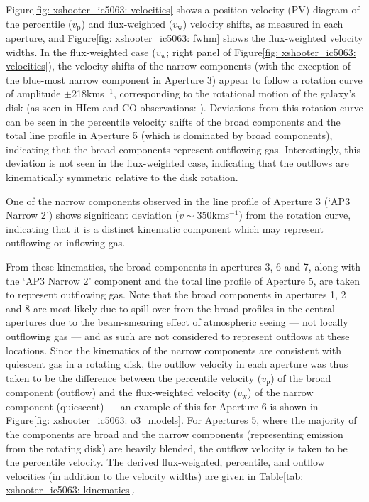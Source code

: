 \newpage
Figure\;\ref{fig: xshooter_ic5063: velocities} shows a position-velocity (PV) diagram of the percentile ($v_\mathrm{p}$) and flux-weighted ($v_\mathrm{w}$) velocity shifts, as measured in each aperture, and Figure\;\ref{fig: xshooter_ic5063: fwhm} shows the flux-weighted velocity widths. In the flux-weighted case ($v_\mathrm{w}$; right panel of Figure\;\ref{fig: xshooter_ic5063: velocities}), the velocity shifts of the narrow components (with the exception of the blue-most narrow component in Aperture 3) appear to follow a rotation curve of amplitude $\pm$218\;km\;s$^{-1}$, corresponding to the rotational motion of the galaxy's disk (as seen in HI\;cm and CO observations: \citealt{Morganti1998, Morganti2015, Oosterloo2017}). Deviations from this rotation curve can be seen in the percentile velocity shifts of the broad components and the total line profile in Aperture 5 (which is dominated by broad components), indicating that the broad components represent outflowing gas. Interestingly, this deviation is not seen in the flux-weighted case, indicating that the outflows are kinematically symmetric relative to the disk rotation. 

One of the narrow components observed in the line profile of Aperture 3 (`AP3 Narrow 2') shows significant deviation ($v\sim350$\;km\;s$^{-1}$) from the rotation curve, indicating that it is a distinct kinematic component which may represent outflowing or inflowing gas. 

From these kinematics, the broad components in apertures 3, 6 and 7, along with the `AP3 Narrow 2' component and the total line profile of Aperture 5, are taken to represent outflowing gas. Note that the broad components in apertures 1, 2 and 8 are most likely due to spill-over from the broad profiles in the central apertures due to the beam-smearing effect of atmospheric seeing --- not locally outflowing gas --- and as such are not considered to represent outflows at these locations. Since the kinematics of the narrow components are consistent with quiescent gas in a rotating disk, the outflow velocity in each aperture was thus taken to be the difference between the percentile velocity ($v_\mathrm{p}$) of the broad component (outflow) and the flux-weighted velocity ($v_\mathrm{w}$) of the narrow component (quiescent) --- an example of this for Aperture 6 is shown in Figure\;\ref{fig: xshooter_ic5063: o3_models}. For Apertures 5, where the majority of the components are broad and the narrow components (representing emission from the rotating disk) are heavily blended, the outflow velocity is taken to be the percentile velocity. The derived flux-weighted, percentile, and outflow velocities (in addition to the velocity widths) are given in Table\;\ref{tab: xshooter_ic5063: kinematics}.

